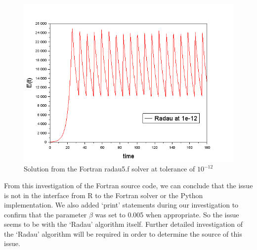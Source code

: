 \begin{figure}[h]
\centering
\includegraphics[width=0.7\linewidth]{./figures/fortran_radau_tol_12}
\caption{Solution from the Fortran radau5.f solver at tolerance of $10^{-12}$}
\label{fig:fortran_radau_tol_12}
\end{figure}

From this investigation of the Fortran source code, we can conclude that the issue is not in the interface from R to the Fortran solver or the Python implementation. We also added `print' statements during our investigation to confirm that the parameter $\beta$ was set to 0.005 when appropriate. So the issue seems to be with the `Radau' algorithm itself. Further detailed investigation of the `Radau' algorithm will be required in order to determine the source of this issue.
